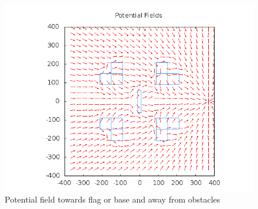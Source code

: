 \documentclass[11pt]{article}
\begin{document}
\begin{figure}[h!]
	\caption{Potential field towards flag or base and away from obstacles}
	\includegraphics[scale=.4]{plots/four_ls/pfFlagsAndObstacles.png}
\end{figure}
\end{document}
